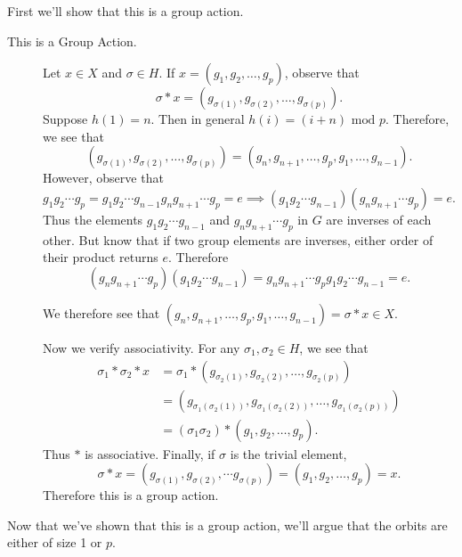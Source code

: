 \begin{prf}
        \textcolor{NavyBlue}{First we'll show that this is a group action.}
        \begin{description}
            \item[This is a Group Action.] 
                Let $x \in X$ and $\sigma \in H$. If $x = (g_1, g_2,
                \dots , g_p)$, observe that 
                \[
                    \sigma * x = (g_{\sigma(1)}, g_{\sigma(2)}, \dots, g_{\sigma(p)}).
                \]
                Suppose $h(1) = n$. Then in general $h(i) = (i + n)
                \mbox{ mod }p.$ Therefore, we see that 
                \[
                    (g_{\sigma(1)}, g_{\sigma(2)}, \dots, g_{\sigma(p)}) 
                    = 
                    (g_{n}, g_{n+1}, \dots, g_p, g_1, \dots, g_{n-1}).
                \]
                However, observe that 
                \[
                    g_1g_2\cdots g_p = g_1g_2 \cdots g_{n-1}g_n g_{n+1} \cdots g_p = e
                    \implies (g_1g_2 \cdots g_{n-1})(g_n g_{n+1} \cdots g_p) = e.
                \]
                Thus the elements $g_1g_2 \cdots g_{n-1}$ and $g_n
                g_{n+1} \cdots g_p$ in $G$ are inverses of each other. But
                know that if two group elements are inverses, either order
                of their product returns $e$. Therefore 
                \[
                    (g_ng_{n+1} \cdots g_{p})(g_1g_2 \cdots g_{n-1}) 
                    = g_ng_{n+1} \cdots g_{p}g_1g_2 \cdots g_{n-1} = e.
                \]
                                
                We therefore see that
                $(g_{n}, g_{n+1}, \dots, g_p,
                g_1, \dots, g_{n-1}) = \sigma *x \in X$. 

                Now we verify associativity. For any $\sigma_1,
                \sigma_2 \in H$, we see that 
                \begin{align*}
                    \sigma_1 * \sigma_2*x &= \sigma_1 * (g_{\sigma_2(1)}, g_{\sigma_2(2)}, \dots, g_{\sigma_2(p)})\\
                    &= (g_{\sigma_1(\sigma_2(1))}, g_{\sigma_1(\sigma_2(2))}, \dots, g_{\sigma_1(\sigma_2(p))})\\
                    &= (\sigma_1 \sigma_2) * (g_1, g_2, \dots, g_p).
                \end{align*}
                Thus $*$ is associative. Finally, if $\sigma$ is the
                trivial element, 
                \[
                    \sigma * x = (g_{\sigma(1)}, g_{\sigma(2)}, \cdots g_{\sigma(p)}) = (g_1, g_2, \dots, g_p) = x.
                \]
                Therefore this is a group action.
        \end{description}
        \textcolor{NavyBlue}{Now that we've shown that this is a group
        action, we'll argue that the orbits are either of size 1 or
        $p$.}
        

\end{prf}
